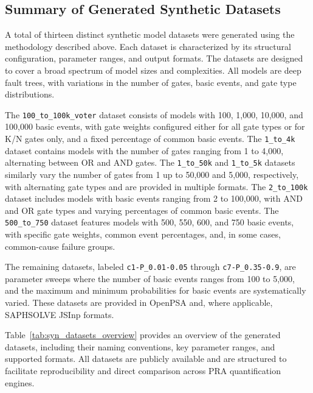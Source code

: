 \subsection{Summary of Generated Synthetic Datasets}
\label{sec:synthetic-datasets-summary}

A total of thirteen distinct synthetic model datasets were generated using the methodology described above. Each dataset is characterized by its structural configuration, parameter ranges, and output formats. The datasets are designed to cover a broad spectrum of model sizes and complexities. All models are deep fault trees, with variations in the number of gates, basic events, and gate type distributions.

The \texttt{100\_to\_100k\_voter} dataset consists of models with 100, 1,000, 10,000, and 100,000 basic events, with gate weights configured either for all gate types or for K/N gates only, and a fixed percentage of common basic events. The \texttt{1\_to\_4k} dataset contains models with the number of gates ranging from 1 to 4,000, alternating between OR and AND gates. The \texttt{1\_to\_50k} and \texttt{1\_to\_5k} datasets similarly vary the number of gates from 1 up to 50,000 and 5,000, respectively, with alternating gate types and are provided in multiple formats. The \texttt{2\_to\_100k} dataset includes models with basic events ranging from 2 to 100,000, with AND and OR gate types and varying percentages of common basic events. The \texttt{500\_to\_750} dataset features models with 500, 550, 600, and 750 basic events, with specific gate weights, common event percentages, and, in some cases, common-cause failure groups.

The remaining datasets, labeled \texttt{c1-P\_0.01-0.05} through \texttt{c7-P\_0.35-0.9}, are parameter sweeps where the number of basic events ranges from 100 to 5,000, and the maximum and minimum probabilities for basic events are systematically varied. These datasets are provided in OpenPSA and, where applicable, SAPHSOLVE JSInp formats.

Table~\ref{tab:syn_datasets_overview} provides an overview of the generated datasets, including their naming conventions, key parameter ranges, and supported formats. All datasets are publicly available and are structured to facilitate reproducibility and direct comparison across PRA quantification engines.





